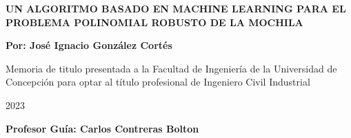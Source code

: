 \documentclass[spanish, a4paper, 12pt, openany,final]{book}
\def\biblio{\clearpage} %
\begin{document}
\def\biblio{}   %

\begin{titlepage}
	
	
	\thispagestyle{frontpage}
	
	\begin{center}
		
		\vspace*{4\baselineskip}
		
		
		{\Huge \textbf{UN ALGORITMO BASADO EN MACHINE LEARNING PARA EL PROBLEMA POLINOMIAL ROBUSTO DE LA MOCHILA\\}}
		\vspace*{1.5\baselineskip}
		
		
		\vspace*{1,5\baselineskip}
		
		\large{\textbf{Por: José Ignacio González Cortés}}\\
		
		\vspace{1,5\baselineskip}
		
		\large{Memoria de titulo presentada a la Facultad de Ingeniería de la Universidad de Concepción para optar al título profesional de Ingeniero Civil Industrial} 
		
		\vspace{1,5\baselineskip}
		\DTMspanishMonthname{\month} 2023  \\
		\vspace{1,5\baselineskip}
		
		\large{\textbf{Profesor Guía: Carlos Contreras Bolton}}\\
		
	\end{center}
	
	\vspace*{4\baselineskip}
	
\end{titlepage}


\vfill

\end{document}
